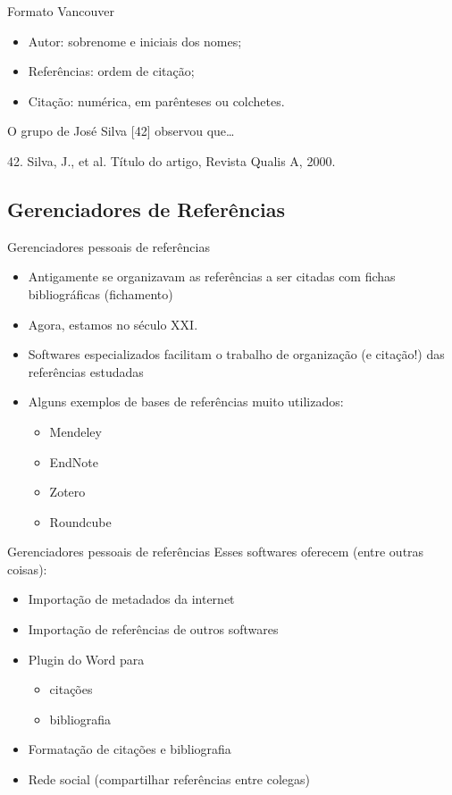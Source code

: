 \documentclass{beamer}
\begin{document}
\begin{frame}{Formato Vancouver}
  \begin{itemize}
  \item Autor: sobrenome e iniciais dos nomes;
  \item Referências: ordem de citação;
  \item Citação: numérica, em parênteses ou colchetes.
  \end{itemize}
  \begin{example}[Citação]
    O grupo de José Silva [42] observou que\ldots
  \end{example}
  \begin{example}[Referência]
    42. Silva, J., et al. Título do artigo, Revista Qualis A, 2000.
  \end{example}
\end{frame}
\subsection{Gerenciadores de Referências}

\begin{frame}{Gerenciadores pessoais de referências}
  \begin{itemize}
  \item Antigamente se organizavam as referências a ser citadas com
    fichas bibliográficas (fichamento)
  \item Agora, estamos no século XXI.
  \item Softwares especializados facilitam o trabalho de organização
    (e citação!) das referências estudadas
  \item Alguns exemplos de bases de referências muito utilizados:
    \begin{itemize}
    \item<4-> \alert<5->{Mendeley}
    \item<4-> EndNote
    \item<4-> Zotero
    \item<4-> Roundcube
    \end{itemize}
  \end{itemize}
\end{frame}

\begin{frame}{Gerenciadores pessoais de referências}
  Esses softwares oferecem (entre outras coisas):
  \begin{itemize}
  \item Importação de metadados da internet
  \item Importação de referências de outros softwares
  \item Plugin do Word para
    \begin{itemize}
    \item<3-> citações
    \item<3-> bibliografia
    \end{itemize}
  \item Formatação de citações e bibliografia
  \item Rede social (compartilhar referências entre colegas)
  \end{itemize}
\end{frame}
\end{document}
